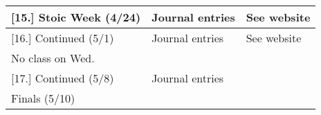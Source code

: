 \documentclass[article,oneside]{memoir}
\begin{document}
\begin{landscape}
\begin{center}
\begin{longtable}{p{8cm}p{4cm}p{8cm}}
[15.] Stoic Week (4/24)				& Journal entries 		&  See website \\  [1\baselineskip] \midrule


[16.] Continued (5/1) 				& Journal entries			& See website \\ 
No class on Wed.					& 					& \\ [1\baselineskip] \midrule
	
[17.] Continued (5/8) 				& Journal entries 	& \\ 
Finals (5/10)						& 				& \\ [1\baselineskip] \midrule

	

\end{longtable}
\end{center}
\end{landscape}
\end{document}
